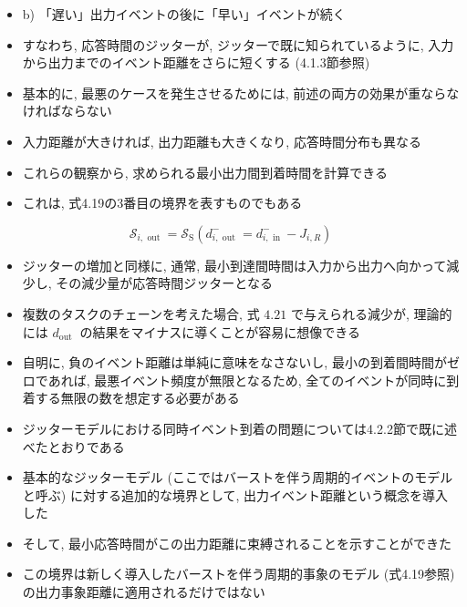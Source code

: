 \begin{frame}{}
\end{frame}

\begin{frame}{}
    \begin{itemize}
        \item b) 「遅い」出力イベントの後に「早い」イベントが続く
        \item すなわち, 応答時間のジッターが, ジッターで既に知られているように, 入力から出力までのイベント距離をさらに短くする (4.1.3節参照)
        \item 基本的に, 最悪のケースを発生させるためには, 前述の両方の効果が重ならなければならない
        \item 入力距離が大きければ, 出力距離も大きくなり, 応答時間分布も異なる
        \item これらの観察から, 求められる最小出力間到着時間を計算できる


        \item これは, 式4.19の3番目の境界を表すものでもある
    \end{itemize}
    \begin{equation*}
        \mathcal{S}_{i, \text { out }}=\mathcal{S}_{\mathrm{S}}\left(d_{i, \text { out }}^{-}=d_{i, \text { in }}^{-}-J_{i, R}\right)
    \end{equation*}
\end{frame}

\begin{frame}{}
    \begin{itemize}
        \item ジッターの増加と同様に, 通常, 最小到達間時間は入力から出力へ向かって減少し, その減少量が応答時間ジッターとなる
        \item 複数のタスクのチェーンを考えた場合, 式 $4.21$ で与えられる減少が, 理論的には $d_{\text {out }}$ の結果をマイナスに導くことが容易に想像できる
        \item 自明に, 負のイベント距離は単純に意味をなさないし, 最小の到着間時間がゼロであれば, 最悪イベント頻度が無限となるため, 全てのイベントが同時に到着する無限の数を想定する必要がある
    \end{itemize}
\end{frame}

\begin{frame}{}
    \begin{itemize}
        \item ジッターモデルにおける同時イベント到着の問題については4.2.2節で既に述べたとおりである
        \item 基本的なジッターモデル (ここではバーストを伴う周期的イベントのモデルと呼ぶ) に対する追加的な境界として, 出力イベント距離という概念を導入した
        \item そして, 最小応答時間がこの出力距離に束縛されることを示すことができた
        \item この境界は新しく導入したバーストを伴う周期的事象のモデル (式4.19参照) の出力事象距離に適用されるだけではない
    \end{itemize}
\end{frame}


